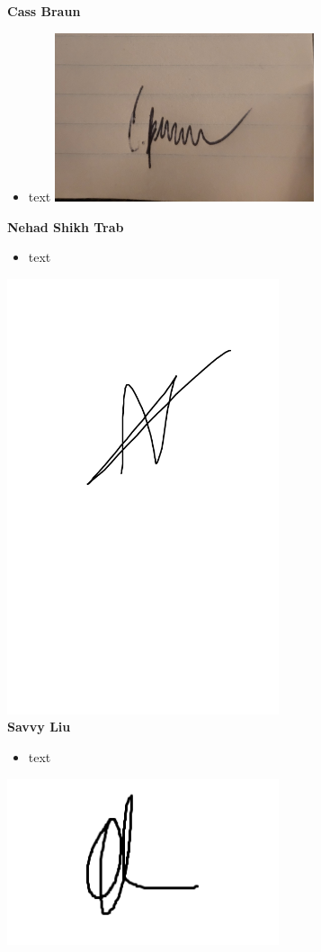 \documentclass[]{article}
\numberwithin{figure}{section}
\begin{document}
\textbf{Cass Braun}
\begin{itemize}
    \setlength\itemindent{2em}
    \item text
\includegraphics[width=0.6\textwidth]{Cass.jpg}
\end{itemize}

\textbf{Nehad Shikh Trab}
\begin{itemize}
    \setlength\itemindent{2em}
\item text
\end{itemize}
\includegraphics[width=0.6\textwidth]{Nehad.png}
\\
\textbf{Savvy Liu}
\begin{itemize}
    \setlength\itemindent{2em}
    \item text
\end{itemize} 
\includegraphics[width=0.6\textwidth]{Savvy.png}
\end{document}
